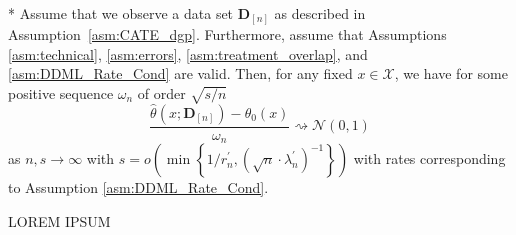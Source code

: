 \begin{boxD}
	\begin{thm}\label{thm:DNNDML2_anorm}\mbox{}\\*
		Assume that we observe a data set $\mathbf{D}_{[n]}$ as described in Assumption~\ref{asm:CATE_dgp}.
        Furthermore, assume that Assumptions \ref{asm:technical}, \ref{asm:errors}, \ref{asm:treatment_overlap}, and \ref{asm:DDML_Rate_Cond} are valid.
		Then, for any fixed $x \in \mathcal{X}$, we have for some positive sequence $\omega_n$ of order $\sqrt{s/n}$
		\begin{equation}
			\frac{\hat{\theta}(x; \mathbf{D}_{[n]}) - \theta_{0}(x)}{\omega_n}
			\rightsquigarrow \mathcal{N}\left(0,1\right)
		\end{equation}
		as $n,s \rightarrow \infty$ with $s = o\left(\min\left\{1/r_{n}^{\prime}, \left(\sqrt{n} \cdot \lambda_{n}^{\prime}\right)^{-1}\right\}\right)$ with rates corresponding to Assumption \ref{asm:DDML_Rate_Cond}.
	\end{thm}
\end{boxD}
{\color{red} LOREM IPSUM}

